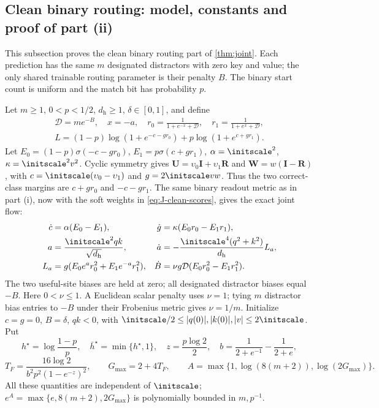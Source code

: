 \subsection{Clean binary routing: model, constants and proof of part (ii)}
\label{app:J-clean}

This subsection proves the clean binary routing part of \cref{thm:joint}. Each prediction has the same $m$ designated distractors
with zero key and value; the only shared trainable routing parameter is their penalty $B$.
The binary start count is uniform and the match bit has probability $p$.

Let $m\ge1$, $0<p<1/2$, $d_{\mathrm h}\ge1$, $\delta\in[0,1]$, and define
\[
 \begin{gathered}
 \mathcal D=me^{-B},\quad x=-a,\quad
 r_0=\frac1{1+e^{-x}+\mathcal D},\quad r_1=\frac1{1+e^x+\mathcal D},\\
 L=(1-p)\log(1+e^{-c-gr_0})+p\log(1+e^{c+gr_1}).
 \end{gathered}
\]
Let $E_0=(1-p)\sigma(-c-gr_0)$, $E_1=p\sigma(c+gr_1)$, $\alpha=\initscale^2$, $\kappa=\initscale^2v^2$.
Cyclic symmetry gives $\mathbf U=\upsilon_0\mathbf I+\upsilon_1\mathbf R$ and $\mathbf W=w(\mathbf I-\mathbf R)$, with
$c=\initscale(\upsilon_0-\upsilon_1)$ and $g=2\initscale vw$. Thus the two correct-class margins are $c+gr_0$ and $-c-gr_1$.
The same binary readout metric as in part (i), now with the soft weights in \cref{eq:J-clean-scores}, gives the exact joint flow:
\begin{align*}
 \dot c&=\alpha(E_0-E_1),&
 \dot g&=\kappa(E_0r_0-E_1r_1),\\
 a&=\frac{\initscale^2qk}{\sqrt{d_{\mathrm h}}},&
 \dot a&=-\frac{\initscale^4(q^2+k^2)}{d_{\mathrm h}}L_a,\\
 L_a&=g(E_0e^a r_0^2+E_1e^{-a}r_1^2),&
 \dot B&=\nu g\mathcal D(E_0r_0^2-E_1r_1^2).
\end{align*}
The two useful-site biases are held at zero; all designated distractor biases equal $-B$.
Here $0<\nu\le1$. A Euclidean scalar penalty uses $\nu=1$; tying $m$ distractor bias entries to $-B$ under their Frobenius metric gives $\nu=1/m$.
Initialize $c=g=0$, $B=\delta$, $qk<0$, with
$\initscale/2\le |q(0)|,|k(0)|,|v|\le2\initscale$.
Put
\begin{equation}
 h^\star=\log\frac{1-p}{p},\quad \bar h^\star=\min\{h^\star,1\},\quad
 z=\frac{p\log2}{2},\quad
 b=\frac1{2+e^{-1}}-\frac1{2+e},
\end{equation}
\begin{equation}
 T_F=\frac{16\log2}{b^2p^2(1-e^{-z})^2},\qquad
 G_{\max}=2+4T_F,\qquad A=\max\{1,\log(8(m+2)),\log(2G_{\max})\}.
 \label{eq:CR-constants}
\end{equation}
All these quantities are independent of $\initscale$; $e^A=\max\{e,8(m+2),2G_{\max}\}$ is polynomially bounded in $m,p^{-1}$.

